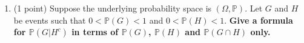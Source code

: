 \documentclass[11pt]{article}
\newcommand{\p}{\mathbb{P}}
\begin{document}
\begin{enumerate}
\begin{proof}
  By the law of total probability,
  \begin{align*}
    \p(A) &= \sum_{i=1}^{4} \p(A\,|\,B_i)\cdot \p(B_i)\\
    &= \sum_{i=1}^{4} \p(A\cap B_i)\\
    &= \p(W, W) + \p(B, B) + \p(\emptyset) + \p(\emptyset)\\
    &= \frac{w}{w+b}\cdot\frac{w+d}{w+b+d}+\frac{b}{w+b}\cdot\frac{w}{w+b+d}\\
    &= \frac{w^2+dw+bw}{(w+b)(w+b+d)}\\
    &= \frac{w(w+b+d)}{(w+b)(w+b+d)}\\
    &= \frac{w}{w+b}
  \end{align*}
  Therefore, we have proven that \(\p(A)\) does not depend on \(d\).
\end{proof}

\item (1 point) Suppose the underlying probability space is $(\Omega,\mathbb{P})$. Let $G$ and $H$ be events such that $0<\mathbb{P}(G)<1$ and $0<\mathbb{P}(H)<1$. \textbf{Give a formula for $\mathbb{P}(G|H^c)$ in terms of $\mathbb{P}(G)$, $\mathbb{P}(H)$ and $\mathbb{P}(G\cap H)$ only.}


\end{enumerate}
\end{document}
